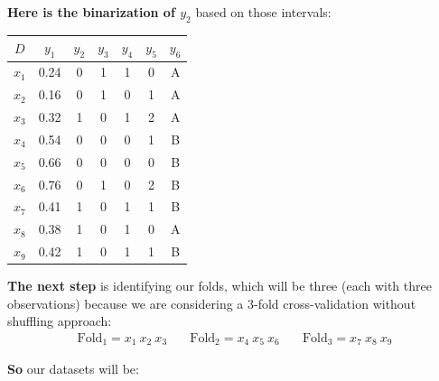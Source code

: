 \documentclass[12pt]{article}
\begin{document}
\begin{enumerate}[leftmargin=\labelsep]
\begin{enumerate}
          \textbf{Here is the binarization of $y_2$} based on those intervals:
          \begin{center}
            \begin{tabular}{c|cccccc}
                \(D\) & \(y_1\) & \(y_2\) & \(y_3\) & \(y_4\) & \(y_5\) & \(y_6\)\\
                \hline
                \(x_1\) & 0.24 & 0 & 1 & 1 & 0 & A  \\
                \(x_2\) & 0.16 & 0 & 1 & 0 & 1 & A  \\
                \(x_3\) & 0.32 & 1 & 0 & 1 & 2 & A  \\
                \(x_4\) & 0.54 & 0 & 0 & 0 & 1 & B  \\
                \(x_5\) & 0.66 & 0 & 0 & 0 & 0 & B  \\
                \(x_6\) & 0.76 & 0 & 1 & 0 & 2 & B  \\
                \(x_7\) & 0.41 & 1 & 0 & 1 & 1 & B  \\
                \(x_8\) & 0.38 & 1 & 0 & 1 & 0 & A  \\
                \(x_9\) & 0.42 & 1 & 0 & 1 & 1 & B  \\
            \end{tabular}
          \end{center}

          \textbf{The next step} is identifying our folds, which will be three (each with three observations) because we are considering a 3-fold cross-validation without shuffling approach:
          \[
              \begin{array}{ccc}
                  \text{Fold}_1 = x_1 \medspace x_2 \medspace x_3 &\quad
                  \text{Fold}_2 = x_4 \medspace x_5 \medspace x_6 &\quad
                  \text{Fold}_3 = x_7 \medspace x_8 \medspace x_9
              \end{array}
          \]

          \textbf{So} our datasets will be:

          \begin{table}[H]
            \centering


\end{table}
\end{enumerate}
\end{enumerate}
\end{document}
